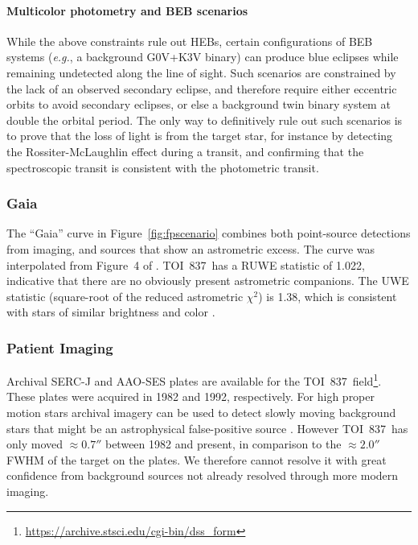 \documentclass[12pt,twocolumn,tighten]{aastex63}
\newcommand{\tn}{TOI~837} %
\begin{document}
\paragraph{Multicolor photometry and BEB scenarios}

While the above constraints rule out HEBs, certain configurations of
BEB systems ({\it e.g.}, a background G0V+K3V binary) can produce blue
eclipses while remaining undetected along the line of sight.  Such
scenarios are constrained by the lack of an observed secondary
eclipse, and therefore require either eccentric orbits to avoid
secondary eclipses, or else a background twin binary system at double
the orbital period.  The only way to definitively rule out such
scenarios is to prove that the loss of light is from the target star,
for instance by detecting the Rossiter-McLaughlin effect during a
transit, and confirming that the spectroscopic transit is consistent
with the photometric transit.


\subsubsection{Gaia}

The ``Gaia'' curve in Figure~\ref{fig:fpscenario} combines both
point-source detections from imaging, and sources that show an
astrometric excess.  The curve was interpolated from Figure~4 of
\citet{rizzuto_zeitVIII_2018}.  \tn\ has a RUWE statistic of 1.022,
indicative that there are no obviously present astrometric companions.
The UWE statistic (square-root of the reduced astrometric $\chi^2$) is
1.38, which is consistent with stars of similar brightness and color
\citep[][Appendix A]{lindegren_gaiasoln_2018}.


\subsubsection{Patient Imaging}

Archival SERC-J and AAO-SES plates are available for the \tn\
field\footnote{\url{https://archive.stsci.edu/cgi-bin/dss_form}}.
These plates were acquired in 1982 and 1992, respectively.  For high
proper motion stars archival imagery can be used to detect slowly
moving background stars that might be an astrophysical false-positive
source \citep[{\it e.g.},][]{bakos_stellar_2006,huang_pimen_2018,vanderburg_hr858_2019}.  However \tn\ has only moved
$\approx0.7''$ between 1982 and present, in comparison to the
$\approx2.0''$ FWHM of the target on the plates.  We therefore cannot
resolve it with great confidence from background sources not already
resolved through more modern imaging.
\end{document}
